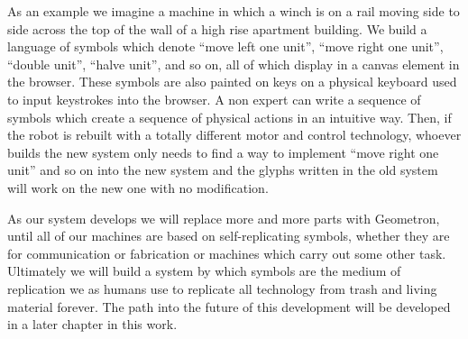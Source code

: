 As an example we imagine a machine in which a winch is on a rail moving
side to side across the top of the wall of a high rise apartment
building. We build a language of symbols which denote ``move left one
unit'', ``move right one unit'', ``double unit'', ``halve unit'', and so
on, all of which display in a canvas element in the browser. These
symbols are also painted on keys on a physical keyboard used to input
keystrokes into the browser. A non expert can write a sequence of
symbols which create a sequence of physical actions in an intuitive way.
Then, if the robot is rebuilt with a totally different motor and control
technology, whoever builds the new system only needs to find a way to
implement ``move right one unit'' and so on into the new system and the
glyphs written in the old system will work on the new one with no
modification.

As our system develops we will replace more and more parts with
Geometron, until all of our machines are based on self-replicating
symbols, whether they are for communication or fabrication or machines
which carry out some other task. Ultimately we will build a system by
which symbols are the medium of replication we as humans use to
replicate all technology from trash and living material forever. The
path into the future of this development will be developed in a later
chapter in this work.

